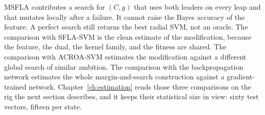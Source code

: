 MSFLA contributes a search for \((C, g)\) that uses both leaders on every leap and that mutates locally after a failure.
It cannot raise the Bayes accuracy of the feature.
A perfect search still returns the best radial SVM, not an oracle.
The comparison with SFLA-SVM is the clean estimate of the modification, because the feature, the dual, the kernel family, and the fitness are shared.
The comparison with ACROA-SVM estimates the modification against a different global search of similar ambition.
The comparison with the backpropagation network estimates the whole margin-and-search construction against a gradient-trained network.
Chapter~\ref{ch:estimation} reads those three comparisons on the rig the next section describes, and it keeps their statistical size in view: sixty test vectors, fifteen per state.


